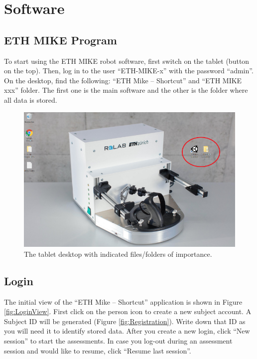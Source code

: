 \documentclass[10pt,oneside,a4paper]{article}
\begin{document}
\newpage
\section{Software}
\subsection{ETH MIKE Program}
To start using the ETH MIKE robot software, first switch on the tablet (button on the top). Then, log in to the user “ETH-MIKE-x” with the password “admin”. \\

On the desktop, find the following: “ETH Mike – Shortcut” and “ETH MIKE xxx” folder. The first one is the main software and the other is the folder where all data is stored. 

\begin{figure}[h!]
\begin{center}
\includegraphics[width=\columnwidth]{images/Hardware/Desktop.png}
\caption{The tablet desktop with indicated files/folders of importance.}
\label{fig:desktop}
\end{center}
\end{figure}

\subsection{Login}
The initial view of the “ETH Mike – Shortcut” application is shown in Figure \ref{fig:LoginView}. First click on the person icon to create a new subject account. A Subject ID will be generated (Figure \ref{fig:Registration}). Write down that ID as you will need it to identify stored data. After you create a new login, click “New session” to start the assessments. In case you log-out during an assessment session and would like to resume, click “Resume last session”. 
\end{document}
